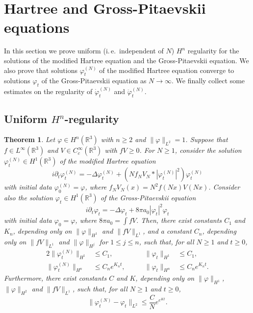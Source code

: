 \documentclass[11pt,a4paper,draft,DIV11]{scrartcl}	%
\newtheorem{thm}{Theorem}[section]
\newcommand{\R}{\mathds{R}}
\newcommand{\ph}{\varphi_t^{(N)}}	%
\newcommand{\phdot}{\dot{\varphi}_t^{(N)}}	%
\newcommand{\phddot}{\ddot{\varphi}_t^{(N)}}	%
\begin{document}
\section{Hartree and Gross-Pitaevskii equations}
\label{s:pde}

In this section we prove uniform (i.\,e.\ independent of $N$) $H^n$
regularity for the solutions of the modified Hartree equation and the
Gross-Pitaevskii equation. We also prove that solutions $\varphi_t^{(N)}$ of
the modified Hartree equation converge to solutions $\varphi_t$ of the
Gross-Pitaevskii equation as $N \to \infty$. We finally collect some
estimates on the regularity of $\phdot$ and $\phddot$.


\subsection{Uniform $H^n$-regularity}
\label{ss:regularity}


\begin{thm} \label{t:pdes}%
  Let $\varphi \in H^n(\R^3)$ with $n \ge 2$ and $\| \varphi \|_{L^2} = 1$.
  Suppose that $f \in L^\infty(\R^3)$ and $V \in C_c^\infty(\R^3)$ with $fV \ge
  0$. For $N \ge 1$, consider the solution $\ph \in H^1(\R^3)$ of the
  modified Hartree equation
  \[
    i \partial_t \varphi_t^{(N)} = - \Delta \varphi_t^{(N)} + (N f_N V_N *
    |\varphi_t^{(N)}|^2) \varphi_t^{(N)}
  \]
  with initial data $\varphi^{(N)}_0 = \varphi$, where $f_N V_N(x) = N^2
  f(Nx)V(Nx)$. Consider also the solution $\varphi_t \in H^1(\R^3)$ of the
  Gross-Pitaevskii equation
  \[
    i \partial_t \varphi_t = - \Delta \varphi_t + 8 \pi a_0 |\varphi_t|^2
    \varphi_t
  \]
  with initial data $\varphi_0 = \varphi$, where $8 \pi a_0 = \int f V$.
  Then, there exist constants $C_1$ and $K_n$, depending only on $\| \varphi
  \|_{H^1}$ and $\| fV \|_{L^1}$, and a constant $C_n$, depending only on
  $\| fV \|_{L^1}$ and $\| \varphi \|_{H^j}$ for $1 \le j \le n$, such that,
  for all $N \ge 1$ and $t \ge 0$,
  \begin{alignat}{2}
    \| \varphi_t^{(N)} \|_{H^1} & \le C_1, & \qquad \| \varphi_t \|_{H^1} &
    \le C_1, \tag{i} \label{H1} \\
    \| \varphi_t^{(N)} \|_{H^n} & \le C_n e^{K_n t}, & \qquad \| \varphi_t
    \|_{H^n} & \le C_n e^{K_n t}. \tag{ii}
  \end{alignat}
  Furthermore, there exist constants $C$ and $K$, depending only on $\|
  \varphi \|_{H^1}$, $\| \varphi \|_{H^2}$ and $\| fV \|_{L^1}$, such that,
  for all $N \geq 1$ and $t \geq 0$,
  \begin{equation}
    \| \varphi_t^{(N)} - \varphi_t \|_{L^2} \le \frac{C}{N} e^{e^{K t}}.
    \tag{iii}
  \end{equation}
\end{thm}
\end{document}
